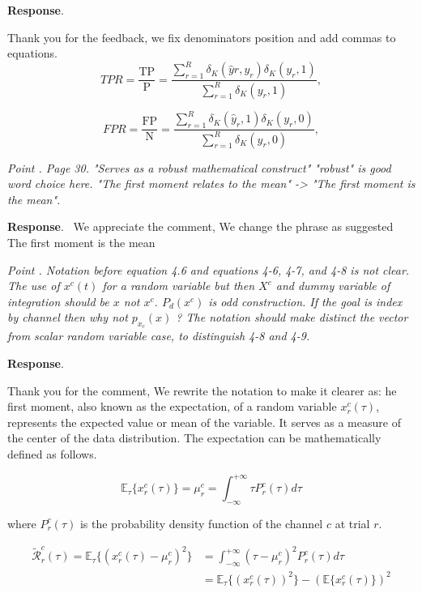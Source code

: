 \documentclass[runningheads]{llncs}
\providecommand{\Kronecker}[2]{\delta_{K}( #1 , #2 )}
\newenvironment{reviewer}{\setcounter{pointcounter}{1}}{}
\newcommand{\changes}[1]{\textcolor[rgb]{1.00,0.00,0.00}{#1}}
\newcommand{\point}[1]{\medskip \noindent
 \textsl{{\fontseries{b}\selectfont Point \thepointcounter}.
 \stepcounter{pointcounter} #1}}
\newcommand{\reply}{\medskip \noindent \textbf{Response}.\ }
\begin{document}
\begin{reviewer}
\reply{
    Thank you for the feedback, we fix denominators position and add commas to equations.
    \changes{
    \begin{equation}
        TPR = \frac{\text{TP}}{\text{P}} = \frac{\sum_{r=1}^{R} \Kronecker{\hat{y}r}{ y_r}\Kronecker{y_r}{1}}{\sum_{r=1}^{R} \Kronecker{y_r}{1}},    
    \end{equation}
    }
    
    \changes{
    \begin{equation}
        FPR = \frac{\text{FP}}{\text{N}} = \frac{\sum_{r=1}^{R} \Kronecker{\hat{y}_r}{ 1}\Kronecker{y_r}{0}}{\sum_{r=1}^{R} \Kronecker{y_r}{0}},
    \end{equation}
    }
}

\point{Page 30. "Serves as a robust mathematical construct"  "robust" is good word choice here.   "The first moment relates to the mean" -> "The first moment is the mean".}

\reply{
    We appreciate the comment, We change the phrase as suggested \changes{The first moment is the mean}
}

\point{Notation before equation 4.6 and equations 4-6, 4-7, and 4-8 is not clear. The use of $x^c(t)$ for a random variable but then $X^c$ and dummy variable of integration should be $x$ not $x^c$. $P_d(x^c)$ is odd construction. If the goal is index by channel then why not $p_{x_c}(x)$ ?  The notation should make distinct the vector from scalar random variable case, to distinguish 4-8 and 4-9. }

\reply{
    Thank you for the comment, We rewrite the notation to make it clearer as:
    he first moment, also known as the expectation, \changes{of a random variable $x^{c}_{r}(\tau)$}, represents the expected value or mean of the variable. It serves as a measure of the center of the data distribution. The expectation can be mathematically defined as follows.

    \changes{
    \begin{equation}
        \mathbb{E}_{\tau}\{x^{c}_{r}(\tau)\} = \mu^{c}_{r} = \int_{-\infty}^{+\infty} \tau P^{c}_{r}(\tau) d\tau
    \end{equation}
    }

    \changes{where $P^{c}_{r}(\tau)$ is the probability density function of the channel $c$ at trial $r$.}

    \changes{
        \begin{equation}
          \begin{split}
            \mathcal{\tilde{R}}^{c}_{r}(\tau) = \mathbb{E}_{\tau}\{(x^{c}_{r}(\tau) - \mu^{c}_{r})^2\} &= \int_{-\infty}^{+\infty} \left( \tau-\mu^{c}_{r} \right) ^2 P^{c}_{r}(\tau) d\tau \\
            &= \mathbb{E}_{\tau}\{(x^{c}_{r}(\tau))^2\} - (\mathbb{E}\{x^{c}_{r}(\tau)\})^2
          \end{split}
        \end{equation}
        }
        
}
\end{reviewer}
\end{document}
